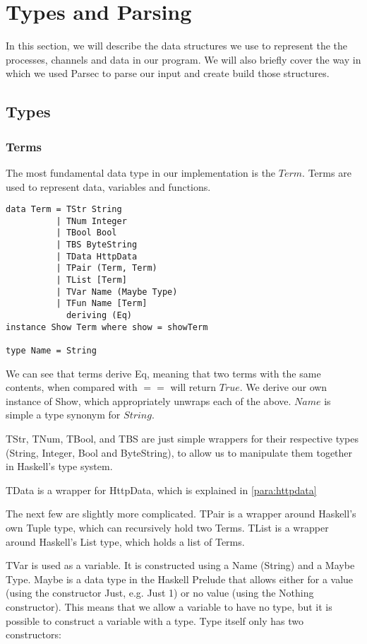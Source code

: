 \section{Types and Parsing}
\label{sec:types}
In this section, we will describe the data structures we use to represent the the processes, channels and data in our program. We will also briefly cover the way in which we used Parsec to parse our input and create build those structures.

\subsection{Types}
\label{subsec:types}

\subsubsection{Terms}

The most fundamental data type in our implementation is the $Term$. Terms are used to represent data, variables and functions.

\begin{verbatim}
data Term = TStr String        
          | TNum Integer
          | TBool Bool
          | TBS ByteString
          | TData HttpData
          | TPair (Term, Term)
          | TList [Term]
          | TVar Name (Maybe Type)
          | TFun Name [Term]
            deriving (Eq)
instance Show Term where show = showTerm

type Name = String
\end{verbatim}
We can see that terms derive Eq, meaning that two terms with the same contents, when compared with $==$ will return $True$. We derive our own instance of Show, which appropriately unwraps each of the above. $Name$ is simple a type synonym for $String$.

TStr, TNum, TBool, and TBS are just simple wrappers for their respective types (String, Integer, Bool and ByteString), to allow us to manipulate them together in Haskell's type system.

TData is a wrapper for HttpData, which is explained in \ref{para:httpdata}

The next few are slightly more complicated. TPair is a wrapper around Haskell's own Tuple type, which can recursively hold two Terms. TList is a wrapper around Haskell's List type, which holds a list of Terms.

TVar is used as a variable. It is constructed using a Name (String) and a Maybe Type. Maybe is a data type in the Haskell Prelude that allows either for a value (using the constructor Just, e.g. Just 1) or no value (using the Nothing constructor). This means that we allow a variable to have no type, but it is possible to construct a variable with a type. Type itself only has two constructors: 

